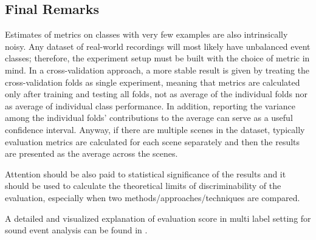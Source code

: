 \subsection{Final Remarks}
Estimates of metrics on classes with very few examples are also intrinsically noisy. Any dataset of real-world
recordings will most likely have unbalanced event classes; therefore, the experiment setup must be built with the choice of metric in mind. In a cross-validation approach, a more stable result is given by treating the cross-validation folds as single experiment, meaning that metrics are calculated only after training and testing all folds, not as average of the individual folds nor as average of individual class performance. In addition, reporting the variance among the individual folds’ contributions to the average
can serve as a useful confidence interval.
Anyway, if there are multiple scenes in the dataset, typically evaluation metrics are calculated for each scene separately and then the results are presented as the average across the scenes.


Attention should be also paid to statistical significance of the results and it should be used to calculate the theoretical limits of discriminability of the evaluation, especially when two methods/approaches/techniques are compared.


A detailed and visualized explanation of evaluation score in multi label setting for sound event analysis can be found in  \cite{mesaros2016metrics}.







%

